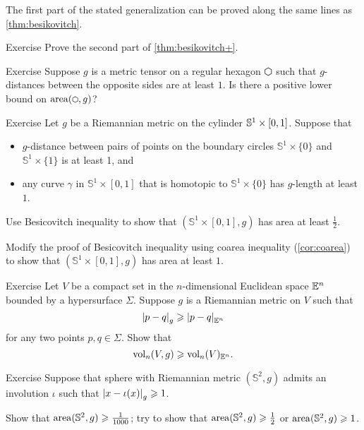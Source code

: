 The first part of the stated generalization can be proved along the same lines as \ref{thm:besikovitch}.

\begin{thm}{Exercise}\label{ex:besikovitch=}
Prove the second part of \ref{thm:besikovitch+}.
\end{thm}

\begin{thm}{Exercise}\label{ex:hexagon}
Suppose $g$ is a metric tensor on a regular hexagon $\varhexagon
   $ such that $g$-distances between the opposite sides are at least $1$.
Is there a positive lower bound on $\area(\varhexagon,g)$?
\end{thm}

\begin{thm}{Exercise}\label{ex:cylinder}
Let $g$ be a Riemannian metric on the cylinder $\mathbb{S}^1\z\times [0,1]$.
Suppose that 
\begin{itemize}
\item 
$g$-distance between pairs of points on the boundary circles $\mathbb{S}^1\times\{0\}$ and $\mathbb{S}^1\times\{1\}$ is at least 1, and 
\item
any curve $\gamma$ in $\mathbb{S}^1\times [0,1]$ that is homotopic to $\mathbb{S}^1\times\{0\}$ has $g$-length at least $1$.
\end{itemize}

\begin{subthm}{}
Use Besicovitch inequality to show that $(\mathbb{S}^1\times [0,1],g)$ has area at least $\tfrac12$. 
\end{subthm}

\begin{subthm}{}
 Modify the proof of Besicovitch inequality using coarea inequality (\ref{cor:coarea}) to show that $(\mathbb{S}^1\times [0,1],g)$ has area at least $1$. 
\end{subthm}

\end{thm}


\begin{thm}{Exercise}\label{ex:gadograph}
Let $V$ be a compact set in the $n$-dimensional Euclidean space $\mathbb{E}^n$ bounded by a hypersurface $\Sigma$.
Suppose $g$ is a Riemannian metric on $V$ such that 
\[\dist{p}{q}{g}\ge\dist{p}{q}{\EE^n}\]
for any two points $p,q\in \Sigma$.
Show that
\[\operatorname{\rm vol}\nolimits_n(V,g)\geqslant \operatorname{\rm vol}\nolimits_n(V)_{\mathbb{E}^n}.\]
 
\end{thm}

\begin{thm}{Exercise}\label{ex:involution-of-sphere}
Suppose that sphere with Riemannian metric $(\mathbb{S}^2,g)$ admits an involution $\iota$ such that $\dist{x}{\iota(x)}{g}\ge 1$.

Show that $\operatorname{\rm area}\nolimits(\mathbb{S}^2,g)\geqslant \tfrac1{1000}$;
try to show that $\operatorname{\rm area}\nolimits(\mathbb{S}^2,g)\geqslant \tfrac12$ or $\operatorname{\rm area}\nolimits(\mathbb{S}^2,g)\geqslant 1$.
\end{thm}

